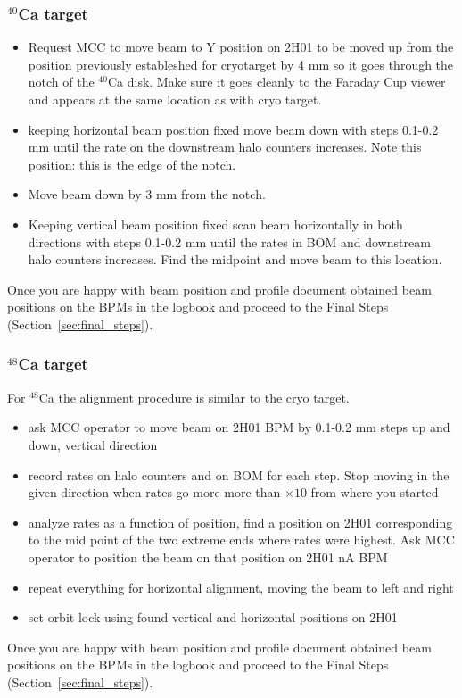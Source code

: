 \subsubsection{$^{40}$Ca target}
\begin{itemize}
\item Request MCC to move beam to Y position on 2H01 to be moved up from the position previously estableshed for cryotarget by 4 mm so it goes through the notch of the $^{40}$Ca disk. Make sure it goes cleanly to the Faraday Cup viewer and appears at the same location as with cryo target.
\item keeping horizontal beam position fixed move beam down with steps 0.1-0.2 mm until the rate on the downstream halo counters increases. 
Note this position: this is the edge of the notch. 
\item Move beam down by 3 mm from the notch.
\item Keeping vertical beam position fixed scan beam horizontally in both directions with steps 0.1-0.2 mm until the rates in BOM and downstream halo counters  increases. Find the midpoint and move beam to this location.
\end{itemize}
Once you are happy with beam position and profile document obtained beam positions on the BPMs in the logbook and proceed to the Final Steps (Section~\ref{sec:final_steps}).

\subsubsection{$^{48}$Ca target}
For $^{48}$Ca the alignment procedure is similar to the cryo target.
\begin{itemize}
\item ask MCC operator to move beam on 2H01 BPM by 0.1-0.2 mm steps up and down, vertical direction
\item record rates on halo counters and on BOM for each step. Stop moving in the given direction when rates go more more than $\times 10$ from where you started 
\item analyze rates as a function of position, find a position on 2H01 corresponding to the mid point of the two extreme ends where rates were highest. Ask MCC operator to position the beam on that position on 2H01 nA BPM
\item  repeat everything for horizontal alignment, moving the beam to left and right 
\item set orbit lock using found vertical and horizontal positions on 2H01 
\end{itemize}
Once you are happy with beam position and profile document obtained beam positions on the BPMs in the logbook and proceed to the Final Steps (Section~\ref{sec:final_steps}).


